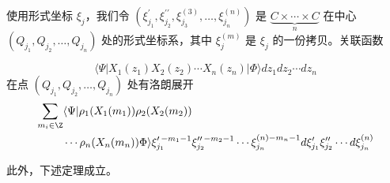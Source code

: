\begin{remark}[3.25]
\begin{sloppypar}使用形式坐标 $\xi_j$，我们令
$(\xi_{j_1}^{\prime},\xi_{j_2}^{\prime\prime},\xi_{j_3}^{(3)},\dots,
\xi_{j_n}^{(n)})$ 是 $\underbrace{C\times\cdots\times C}_{n}$ 在中心
$(Q_{j_1},Q_{j_2},\dots,Q_{j_n})$ 处的形式坐标系，其中 $\xi_j^{(m)}$ 是
$\xi_j$ 的一份拷贝。关联函数
\end{sloppypar}
\[
  \langle\Psi|X_1(z_1)X_2(z_2)\cdots X_n(z_n)|\Phi\rangle
  dz_1dz_2\cdots dz_n
\]
在点 $(Q_{j_1},Q_{j_2},\dots,Q_{j_n})$ 处有洛朗展开
\[
  \begin{aligned}
  \sum_{m_i\in\Z}
  &\langle\Psi|\rho_1(X_1(m_1))\rho_2(X_2(m_2))\\
  &\cdots\rho_n(X_n(m_n))\Phi\rangle
  \xi_{j_1}^{\prime\,-m_1-1}\xi_{j_2}^{\prime\prime\,-m_2-1}\cdots
  \xi_{j_n}^{(n)-m_n-1}
  d\xi_{j_1}^{\prime}\xi_{j_2}^{\prime\prime}\cdots d\xi_{j_n}^{(n)}
  \end{aligned}
\]
\end{remark}

此外，下述定理成立。

